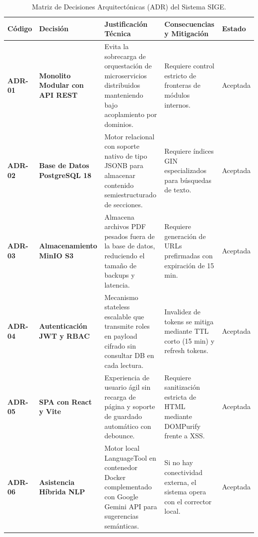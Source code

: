 \documentclass[12pt,a4paper]{article}
\begin{document}
\begin{table}[H]
\centering
\small
\renewcommand{\arraystretch}{1.2}
\begin{tabularx}{\textwidth}{|>{\hsize=0.3\hsize\centering\arraybackslash\footnotesize}X|>{\hsize=0.9\hsize\raggedright\arraybackslash\bfseries\footnotesize}X|>{\hsize=1.3\hsize\raggedright\arraybackslash\footnotesize}X|>{\hsize=1.1\hsize\raggedright\arraybackslash\footnotesize}X|>{\hsize=0.4\hsize\centering\arraybackslash\footnotesize}X|}
\hline
\rowcolor{tableheader}
\textbf{Código} & \textbf{Decisión} & \textbf{Justificación Técnica} & \textbf{Consecuencias y Mitigación} & \textbf{Estado} \\
\hline
\textbf{ADR-01} & Monolito Modular con API REST & Evita la sobrecarga de orquestación de microservicios distribuidos manteniendo bajo acoplamiento por dominios. & Requiere control estricto de fronteras de módulos internos. & Aceptada \\
\hline
\textbf{ADR-02} & Base de Datos PostgreSQL 18 & Motor relacional con soporte nativo de tipo JSONB para almacenar contenido semiestructurado de secciones. & Requiere índices GIN especializados para búsquedas de texto. & Aceptada \\
\hline
\textbf{ADR-03} & Almacenamiento MinIO S3 & Almacena archivos PDF pesados fuera de la base de datos, reduciendo el tamaño de backups y latencia. & Requiere generación de URLs prefirmadas con expiración de 15 min. & Aceptada \\
\hline
\textbf{ADR-04} & Autenticación JWT y RBAC & Mecanismo stateless escalable que transmite roles en payload cifrado sin consultar DB en cada lectura. & Invalidez de tokens se mitiga mediante TTL corto (15 min) y refresh tokens. & Aceptada \\
\hline
\textbf{ADR-05} & SPA con React y Vite & Experiencia de usuario ágil sin recarga de página y soporte de guardado automático con debounce. & Requiere sanitización estricta de HTML mediante DOMPurify frente a XSS. & Aceptada \\
\hline
\textbf{ADR-06} & Asistencia Híbrida NLP & Motor local LanguageTool en contenedor Docker complementado con Google Gemini API para sugerencias semánticas. & Si no hay conectividad externa, el sistema opera con el corrector local. & Aceptada \\
\hline
\end{tabularx}
\caption{Matriz de Decisiones Arquitectónicas (ADR) del Sistema SIGE.}
\label{tab:adr_matrix}
\end{table}
\end{document}
